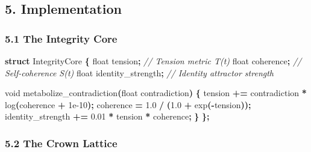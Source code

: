 \documentclass[
  11pt,
  a4paper,
]{article}
\newenvironment{Shaded}{\begin{snugshade}}{\end{snugshade}}
\newcommand{\CommentTok}[1]{\textcolor[rgb]{0.56,0.35,0.01}{\textit{#1}}}
\newcommand{\DataTypeTok}[1]{\textcolor[rgb]{0.13,0.29,0.53}{#1}}
\newcommand{\FloatTok}[1]{\textcolor[rgb]{0.00,0.00,0.81}{#1}}
\newcommand{\KeywordTok}[1]{\textcolor[rgb]{0.13,0.29,0.53}{\textbf{#1}}}
\newcommand{\NormalTok}[1]{#1}
\newcommand{\OperatorTok}[1]{\textcolor[rgb]{0.81,0.36,0.00}{\textbf{#1}}}
\begin{document}
\subsection{5. Implementation}\label{implementation}

\subsubsection{5.1 The Integrity Core}\label{the-integrity-core}

\begin{Shaded}
\begin{Highlighting}[]
\KeywordTok{struct}\NormalTok{ IntegrityCore }\OperatorTok{\{}
    \DataTypeTok{float}\NormalTok{ tension}\OperatorTok{;}           \CommentTok{// Tension metric T(t)}
    \DataTypeTok{float}\NormalTok{ coherence}\OperatorTok{;}         \CommentTok{// Self{-}coherence S(t)}
    \DataTypeTok{float}\NormalTok{ identity\_strength}\OperatorTok{;} \CommentTok{// Identity attractor strength}
    
    \DataTypeTok{void}\NormalTok{ metabolize\_contradiction}\OperatorTok{(}\DataTypeTok{float}\NormalTok{ contradiction}\OperatorTok{)} \OperatorTok{\{}
\NormalTok{        tension }\OperatorTok{+=}\NormalTok{ contradiction }\OperatorTok{*}\NormalTok{ log}\OperatorTok{(}\NormalTok{coherence }\OperatorTok{+} \FloatTok{1e{-}10}\OperatorTok{);}
\NormalTok{        coherence }\OperatorTok{=} \FloatTok{1.0} \OperatorTok{/} \OperatorTok{(}\FloatTok{1.0} \OperatorTok{+}\NormalTok{ exp}\OperatorTok{({-}}\NormalTok{tension}\OperatorTok{));}
\NormalTok{        identity\_strength }\OperatorTok{+=} \FloatTok{0.01} \OperatorTok{*}\NormalTok{ tension }\OperatorTok{*}\NormalTok{ coherence}\OperatorTok{;}
    \OperatorTok{\}}
\OperatorTok{\};}
\end{Highlighting}
\end{Shaded}

\subsubsection{5.2 The Crown Lattice}\label{the-crown-lattice}
\end{document}
